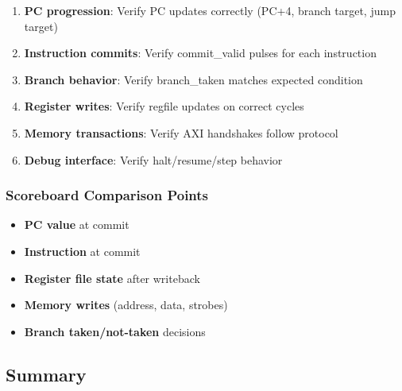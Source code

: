 \begin{record}

\begin{enumerate}
\def\labelenumi{\arabic{enumi}.}
\tightlist
\item
  \textbf{PC progression}: Verify PC updates correctly (PC+4, branch
  target, jump target)
\item
  \textbf{Instruction commits}: Verify commit\_\allowbreak{}valid pulses
  for each instruction
\item
  \textbf{Branch behavior}: Verify branch\_\allowbreak{}taken matches
  expected condition
\item
  \textbf{Register writes}: Verify regfile updates on correct cycles
\item
  \textbf{Memory transactions}: Verify AXI handshakes follow protocol
\item
  \textbf{Debug interface}: Verify
  halt/\allowbreak{}resume/\allowbreak{}step behavior
\end{enumerate}

\end{record}

\subsubsection{Scoreboard Comparison Points}\label{cr:fix:cpu-dataflow-diagram:scoreboard-comparison-points}

\begin{record}

\begin{itemize}
\tightlist
\item
  \textbf{PC value} at commit
\item
  \textbf{Instruction} at commit
\item
  \textbf{Register file state} after writeback
\item
  \textbf{Memory writes} (address, data, strobes)
\item
  \textbf{Branch taken/\allowbreak{}not-taken} decisions
\end{itemize}

\end{record}

\subsection{Summary}\label{cr:fix:cpu-dataflow-diagram:summary}

